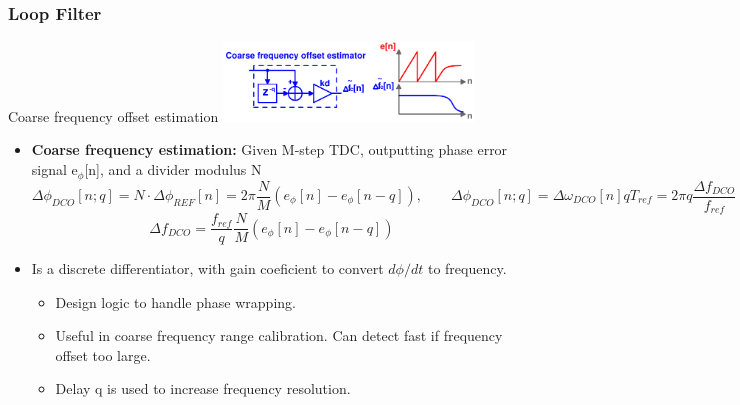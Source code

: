 \documentclass[t, screen, aspectratio=43]{beamer}
\begin{document}
\begin{frame}
	\frametitle{Loop Filter}
	\begin{block}{Coarse frequency offset estimation}
		\vspace{-0.5em}
		\center\includegraphics[width=0.5\textwidth, angle=0]{coarse_est.pdf}
		\begin{itemize}
			\footnotesize
			\item \textbf{Coarse frequency estimation:} Given M-step TDC, outputting phase error signal e$_\phi$[n], and a divider modulus N
			\tiny
			\vspace{-1em}
			\begin{equation}
				\Delta \phi_{DCO}[n; q] = N\cdot\Delta \phi_{REF}[n] = 2\pi \frac{N}{M}\left( e_\phi[n]-e_\phi[n-q]\right ),\hspace{2em} \Delta \phi_{DCO}[n; q] = \Delta \omega_{DCO}[n]qT_{ref} = 2\pi q \frac{\Delta f_{DCO}}{f_{ref}}
			\end{equation}
			\vspace{-1em}
			\begin{equation}
				\Delta f_{DCO} = \frac{f_{ref}}{q}\frac{N}{M}\left( e_\phi[n]-e_\phi[n-q]\right )
			\end{equation}				
			\footnotesize	
			\item Is a discrete differentiator, with gain coeficient to convert $d\phi/dt$ to frequency. 
			\begin{itemize}
				\scriptsize
				\item Design logic to handle phase wrapping.	
				\item Useful in coarse frequency range calibration. Can detect fast if frequency offset too large.
				\item Delay q is used to increase frequency resolution. 
			\end{itemize}			
		\end{itemize} 	
	\end{block}
\end{frame}
\end{document}
